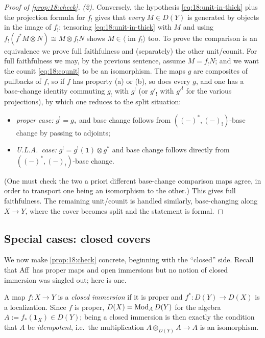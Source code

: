 \begin{proof}[Proof of \cref{prop:18:check}]
\emph{(2).} Conversely, the hypothesis \eqref{eq:18:unit-in-thick} plus the
projection formula for $f_!$ gives that \emph{every} $M\in D(Y)$ is generated by
objects in the image of $f_!$: tensoring \eqref{eq:18:unit-in-thick} with $M$ and
using $f_!(f^*M\otimes N)\cong M\otimes f_!N$ shows $M\in\langle\operatorname{im}
f_!\rangle$ too. To prove the comparison is an equivalence we prove full
faithfulness and (separately) the other unit/counit. For full faithfulness we may,
by the previous sentence, assume $M=f_!N$; and we want the counit
\eqref{eq:18:counit} to be an isomorphism. The maps $g$ are composites of
pullbacks of $f$, so if $f$ has property (a) or (b), so does every $g$, and one has
a base-change identity commuting $g_!$ with $g^!$ (or $g'_!$ with $g'^!$ for the
various projections), by which one reduces to the split situation:
\begin{itemize}
\item \emph{proper case:} $g^!=g_*$ and base change follows from
$((-)^*,(-)_!)$-base change by passing to adjoints;
\item \emph{U.L.A.\ case:} $g^!=g^!(\mathbf 1)\otimes g^*$ and base change follows
directly from $((-)^*,(-)_!)$-base change.
\end{itemize}
(One must check the two a priori different base-change comparison maps agree, in
order to transport one being an isomorphism to the other.) This gives full
faithfulness. The remaining unit/counit is handled similarly, base-changing along
$X\to Y$, where the cover becomes split and the statement is formal.
\end{proof}

\subsection{Special cases: closed covers}
\label{subsec:18:closed}

We now make \cref{prop:18:check} concrete, beginning with the ``closed'' side.
Recall that $\operatorname{Aff}$ has proper maps and open immersions but no notion of closed
immersion was singled out; here is one.

\begin{definition}
\label{def:18:closed}
A map $f\colon X\to Y$ is a \emph{closed immersion} if it is proper and
$f^*\colon D(Y)\to D(X)$ is a localization. Since $f$ is proper, $D(X)=\operatorname{Mod}_{A}
D(Y)$ for the algebra $A:=f_*(\mathbf 1_X)\in D(Y)$; being a closed immersion is
then exactly the condition that $A$ be \emph{idempotent}, i.e.\ the multiplication
$A\otimes_{D(Y)}A\to A$ is an isomorphism.
\end{definition}

